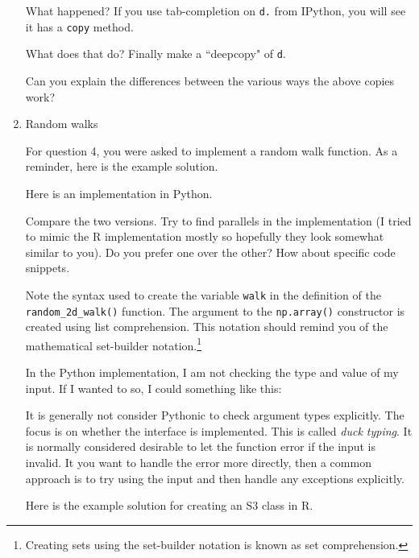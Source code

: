 \documentclass{article}
\begin{document}
\begin{enumerate}
What happened?  If you use tab-completion on \texttt{d.} from IPython, you will
see it has a \texttt{copy} method.


What does that do?  Finally make a ``deepcopy" of \texttt{d}.


Can you explain the differences between the various ways the above copies work?

\item Random walks

For question 4, you were asked to implement a random walk function. As a
reminder, here is the example solution.


Here is an implementation in Python.


Compare the two versions.  Try to find parallels in the implementation (I tried
to mimic the R implementation mostly so hopefully they look somewhat similar to
you).  Do you prefer one over the other?  How about specific code snippets.

Note the syntax used to create the variable \texttt{walk} in the definition of
the \texttt{random\_2d\_walk()} function.  The argument to the
\texttt{np.array()} constructor is created using list comprehension.  This
notation should remind you of the mathematical set-builder
notation.\footnote{Creating sets using the set-builder notation is known as set
comprehension.}

In the Python implementation, I am not checking the type and value of my input.
If I wanted to so, I could something like this:


It is generally not consider Pythonic to check argument types explicitly.  The
focus is on whether the interface is implemented.  This is called \emph{duck
typing}.  It is normally considered desirable to let the function error if
the input is invalid.  It you want to handle the error more directly, then a
common approach is to try using the input and then handle any exceptions
explicitly.

Here is the example solution for creating an S3 class in R.


\end{enumerate}
\end{document}
